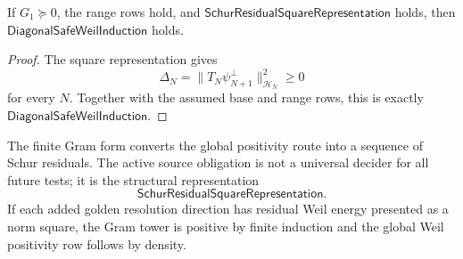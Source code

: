 \begin{theorem}
\label{thm:rh-square-representation-gives-diagonal-safe-induction}
If $G_1\succeq0$, the range rows hold, and
$\mathsf{SchurResidualSquareRepresentation}$ holds, then
$\mathsf{DiagonalSafeWeilInduction}$ holds.
\end{theorem}

\begin{proof}
The square representation gives
$$
\Delta_N
=
\|T_N\psi_{N+1}^{\perp}\|_{\mathcal H_N}^2
\ge0
$$
for every $N$.  Together with the assumed base and range rows, this is
exactly $\mathsf{DiagonalSafeWeilInduction}$.
\end{proof}

\begin{principle}
\label{prin:rh-finite-induction-target}
The finite Gram form converts the global positivity route into a
sequence of Schur residuals.  The active source obligation is not a
universal decider for all future tests; it is the structural
representation
$$
\mathsf{SchurResidualSquareRepresentation}.
$$
If each added golden resolution direction has residual Weil energy
presented as a norm square, the Gram tower is positive by finite
induction and the global Weil positivity row follows by density.
\end{principle}


